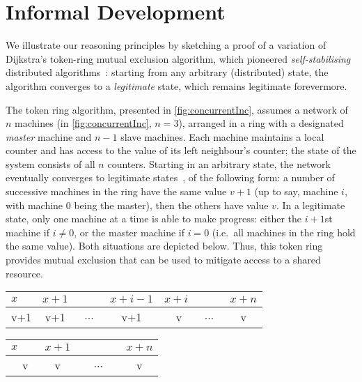 \section{Informal Development}
\label{sec:intuition}

We illustrate our \colosl reasoning principles by sketching a proof of
a variation of Dijkstra's token-ring mutual exclusion algorithm, which
pioneered \emph{self-stabilising} distributed
algorithms~\cite{dijkstra74}: starting from any arbitrary
(distributed) state, the algorithm converges to a \emph{legitimate}
state, which remains legitimate forevermore.

The token ring algorithm, presented in \fig\ref{fig:concurrentInc},
assumes a network of $n$ machines (in \fig\ref{fig:concurrentInc},
$n=3$), arranged in a ring with a designated \emph{master} machine and
$n-1$ slave machines. Each machine maintains a local counter and has
access to the value of its left neighbour's counter; the state of the
system consists of all $n$ counters. Starting in an arbitrary state,
the network eventually converges to legitimate
states~\cite{dijkstra-proof}, of the following form: a number of
successive machines in the ring have the same value $v+1$ (up to say,
machine $i$, with machine $0$ being the master), then the others have
value $v$.  In a legitimate state, only one machine at a time is able
to make progress: either the $i+1$st machine if $i\neq 0$, or the
master machine if $i=0$ (i.e.\ all machines in the ring hold the same
value). Both situations are depicted below. Thus, this token ring
provides mutual exclusion that can be used to mitigate access to a
shared resource.\\ \null\hfill
  \begin{tabular}{lllllll}
    $x$&$x{+}1$&&$x{+}i{-}1$&$x{+}i$&&$x{+}n$
    \\
    \hline
    \multicolumn{1}{|c|}{v+1} &
    \multicolumn{1}{|c|}{v+1} &
    \multicolumn{1}{|c|}{~$\cdots$~} &
    \multicolumn{1}{|c|}{v+1} &
    \multicolumn{1}{|c|}{~~v~\raisebox{1ex}{$\bullet$}} &
    \multicolumn{1}{|c|}{~$\cdots$~} &
    \multicolumn{1}{|c|}{v}\\
    \hline
  \end{tabular}\hfill
  \begin{tabular}{lllllll}
    $x$&$x{+}1$&&&&&$x{+}n$\\
    \hline
    \multicolumn{1}{|c|}{~~v~\raisebox{1ex}{$\bullet$}} &
    \multicolumn{1}{|c|}{v} &
    \multicolumn{4}{|c|}{~$\cdots$~} &
    \multicolumn{1}{|c|}{v}\\
    \hline
  \end{tabular}
  \hfill\null\\


